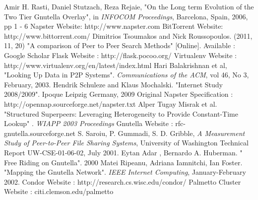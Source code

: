 \documentclass{acm_proc_article-sp}
\begin{document}









%
%
%
\begin{thebibliography}{99}


Amir H. Rasti, Daniel Stutzach, Reza Rejaie, "On the Long term Evolution of the Two Tier Gnutella Overlay", in \emph{INFOCOM Proceedings}, Barcelona, Spain, 2006, pp 1 - 6
Napster Website: http://www.napster.com
BitTorrent Website: http://www.bittorrent.com/
Dimitrios Tsoumakos and Nick Roussopoulos. (2011, 11, 20) "A comparison of Peer to Peer Search Methods" [Online]. Available : Google Scholar
Flask Website : http://flask.pocoo.org/
Virtualenv Website : http://www.virtualenv.org/en/latest/index.html
Hari Balakrishnan et al, "Looking Up Data in P2P Systems". \emph{Communications of the ACM}, vol 46, No 3,  February, 2003.
Hendrik Schuleze and Klaus Mochalski. "Internet Study 2008/2009". Ipoque Leipzig Germany, 2009
Original Napster Specification : http://opennap.sourceforge.net/napster.txt
Alper Tugay Misrak et al. "Structured Superpeers: Leveraging Heterogeneity to Provide Constant-Time Lookup" . \emph{WIAPP 2003 Proceedings}
Gnutella Website : rfc-gnutella.sourceforge.net
S. Saroiu, P. Gummadi, S. D. Gribble,  \emph{A Measurement Study of Peer-to-Peer File Sharing Systems}, 
University of Washington Technical Report UW-CSE-01-06-02, July 2001.
Eytan Adar , Bernardo A. Huberman. " Free Riding on Gnutella". 2000
Matei Ripeanu, Adriana Iamnitchi, Ian Foster. "Mapping the Gnutella Network". \emph{IEEE Internet Computing}, January-February 2002.  
Condor Website : http://research.cs.wisc.edu/condor/
Palmetto Cluster Website : citi.clemson.edu/palmetto

\end{thebibliography}








\end{document}

